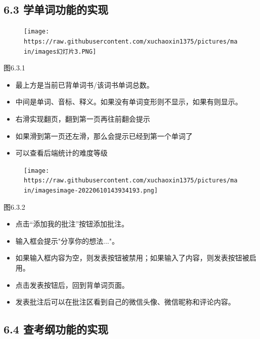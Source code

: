 \documentclass[
]{article}
\begin{document}
\hypertarget{63-ux5b66ux5355ux8bcdux529fux80fdux7684ux5b9eux73b0}{%
\subsection{6.3
学单词功能的实现}\label{63-ux5b66ux5355ux8bcdux529fux80fdux7684ux5b9eux73b0}}

\begin{figure}
\centering
\texttt{[image: https://raw.githubusercontent.com/xuchaoxin1375/pictures/main/images幻灯片3.PNG]}
\caption{}
\end{figure}

图6.3.1

\begin{itemize}
\item
  最上方是当前已背单词书/该词书单词总数。
\item
  中间是单词、音标、释义。如果没有单词变形则不显示，如果有则显示。
\item
  右滑实现翻页，翻到第一页再往前翻会提示
\item
  如果滑到第一页还左滑，那么会提示已经到第一个单词了
\item
  可以查看后端统计的难度等级
\end{itemize}

\begin{figure}
\centering
\texttt{[image: https://raw.githubusercontent.com/xuchaoxin1375/pictures/main/imagesimage-20220610143934193.png]}
\caption{}
\end{figure}

图6.3.2

\begin{itemize}
\item
  点击``添加我的批注''按钮添加批注。
\item
  输入框会提示"分享你的想法..."。
\item
  如果输入框内容为空，则发表按钮被禁用；如果输入了内容，则发表按钮被启用。
\item
  点击发表按钮后，回到背单词页面。
\item
  发表批注后可以在批注区看到自己的微信头像、微信昵称和评论内容。
\end{itemize}

\hypertarget{64-ux67e5ux8003ux7eb2ux529fux80fdux7684ux5b9eux73b0}{%
\subsection{6.4
查考纲功能的实现}\label{64-ux67e5ux8003ux7eb2ux529fux80fdux7684ux5b9eux73b0}}
\end{document}
